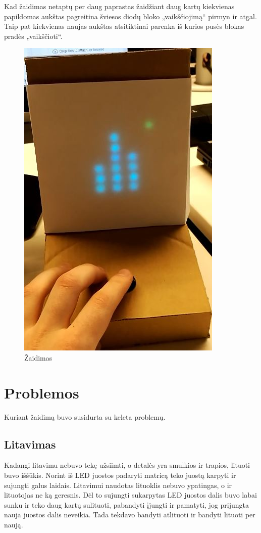 \documentclass{VUMIFPSkursinis}
\begin{document}
  Kad žaidimas netaptų per daug paprastas žaidžiant daug kartų kiekvienas papildomas aukštas
  pagreitina šviesos diodų bloko „vaikščiojimą“ pirmyn ir atgal. Taip pat kiekvienas naujas aukštas
  atsitiktinai parenka iš kurios pusės blokas pradės „vaikščioti“.

  \begin{figure}[H]
    \centering
    \includegraphics[scale=0.7]{img/game}
    \caption{Žaidimas}
    \label{img:game}
  \end{figure}


\section{Problemos}

  Kuriant žaidimą buvo susidurta su keleta problemų.

  \subsection{Litavimas}
    Kadangi litavimu nebuvo tekę užsiimti, o detalės yra smulkios ir trapios, lituoti buvo iššūkis.
    Norint iš LED juostos padaryti matricą teko juostą karpyti ir sujungti galus laidais.
    Litavimui naudotas lituoklis nebuvo ypatingas, o ir lituotojas ne ką geresnis.
    Dėl to sujungti sukarpytas LED juostos dalis buvo labai sunku ir teko daug kartų sulituoti,
    pabandyti įjungti ir pamatyti, jog prijungta nauja juostos dalis neveikia. Tada tekdavo bandyti atlituoti
    ir bandyti lituoti per naują.
\end{document}
